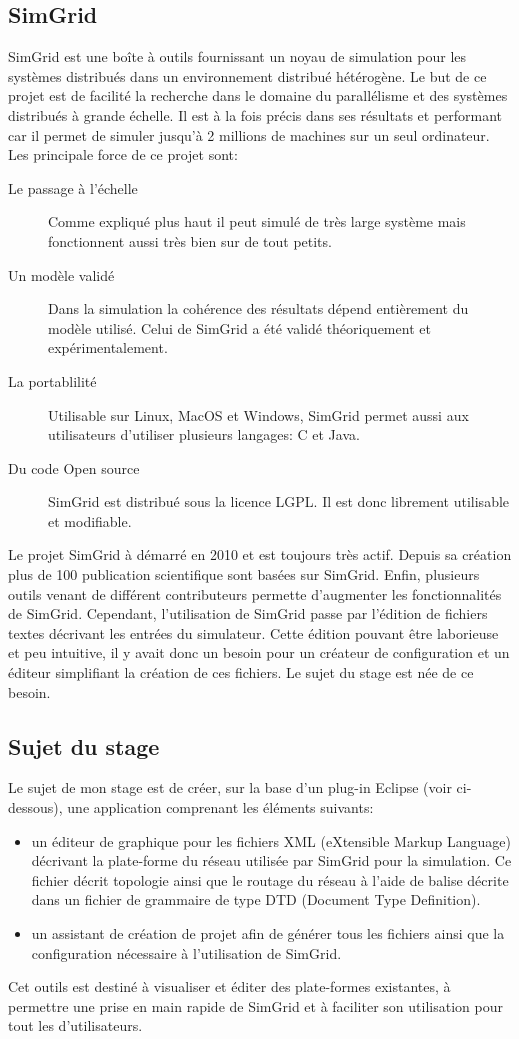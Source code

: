 \documentclass{article}
\begin{document}
	\subsection{SimGrid}
	SimGrid est une boîte à outils fournissant un noyau de simulation pour les systèmes distribués dans un environnement distribué hétérogène. Le but de ce projet est de facilité la recherche dans le domaine du parallélisme et des systèmes distribués à grande échelle. Il est à la fois précis dans ses résultats et performant car il permet de simuler jusqu'à 2 millions de machines sur un seul ordinateur.
	Les principale force de ce projet sont:
	\begin{description}
		\item[Le passage à l'échelle] Comme expliqué plus haut il peut simulé de très large système mais fonctionnent aussi très bien sur de tout petits.
		\item[Un modèle validé] Dans la simulation la cohérence des résultats dépend entièrement du modèle utilisé. Celui de SimGrid a été validé théoriquement et expérimentalement.
		\item[La portablilité] Utilisable sur Linux, MacOS et Windows, SimGrid permet aussi aux utilisateurs d'utiliser plusieurs langages: C et Java.
		\item[Du code Open source] SimGrid est distribué sous la licence LGPL. Il est donc librement utilisable et modifiable.
	\end{description}
	Le projet SimGrid à démarré en 2010 et est toujours très actif. Depuis sa création plus de 100 publication scientifique sont basées sur SimGrid. Enfin, plusieurs outils venant de différent  contributeurs permette d'augmenter les fonctionnalités de SimGrid. 
	Cependant, l'utilisation de SimGrid passe par l'édition de fichiers textes décrivant les entrées du simulateur. Cette édition pouvant être laborieuse et peu intuitive, il y avait donc un besoin pour un créateur de configuration et un éditeur simplifiant la création de ces fichiers. Le sujet du stage est née de ce besoin.

	\subsection{Sujet du stage}
		Le sujet de mon stage est de créer, sur la base d'un plug-in Eclipse (voir ci-dessous), une application comprenant les éléments suivants:
		\begin{itemize}
	 		\item un éditeur de graphique pour les fichiers XML (eXtensible Markup Language) décrivant la plate-forme du réseau utilisée par SimGrid pour la simulation. Ce fichier décrit topologie ainsi que le routage du réseau à l'aide de balise décrite dans un fichier de grammaire de type DTD (Document Type Definition).
	 		\item un assistant de création de projet afin de générer tous les fichiers ainsi que la configuration nécessaire à l'utilisation de SimGrid.
		\end{itemize}
	Cet outils est destiné à visualiser et éditer des plate-formes existantes, à permettre une prise en main rapide de SimGrid et à faciliter son utilisation pour tout les d'utilisateurs.
\end{document}
